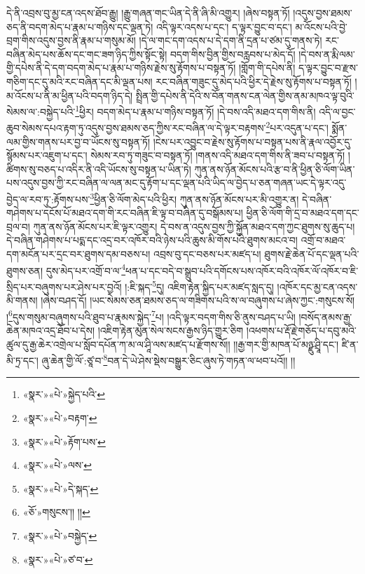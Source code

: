 དེ་ནི་འབྲས་བུ་མྱ་ངན་འདས་ཐོབ་རྒྱུ། །རྒྱུ་གཞན་གང་ཡིན་དེ་ནི་ཞི་མི་འགྱུར། །ཞེས་བསྟན་ཏོ། །འདུས་བྱས་ཐམས་ཅད་ནི་བདག་མེད་པ་རྣམ་པ་གཉིས་དང་ལྡན་ཏེ། འདི་ལྟར་འདས་པ་དང་། ད་ལྟར་བྱུང་བ་དང་། མ་འོངས་པའི་བྱེ་བྲག་གིས་འདུས་བྱས་ནི་རྣམ་པ་གསུམ་མོ། །དེ་ལ་གང་དག་འདས་པ་དེ་དག་ནི་དྲན་པ་ཙམ་དུ་གནས་ཏེ། རང་བཞིན་མེད་པས་ཆོས་དང་གང་ཟག་ཉིད་ཀྱིས་སྟོང་སྟེ། བདག་གིས་བྱིན་གྱིས་བརླབས་པ་མེད་དོ། །དེ་བས་ན་རྨི་ལམ་གྱི་དཔེས་ནི་དེ་དག་བདག་མེད་པ་རྣམ་པ་གཉིས་རྗེས་སུ་རྟོགས་པ་བསྟན་ཏོ། །གློག་གི་དཔེས་ནི། ད་ལྟར་བྱུང་བ་རྫས་གཅིག་དང་དུ་མའི་རང་བཞིན་དང་མི་ལྡན་པས། རང་བཞིན་གཟུང་དུ་མེད་པའི་ཕྱིར་དེ་རྗེས་སུ་རྟོགས་པ་བསྟན་ཏོ། །མ་འོངས་པ་ནི་མ་ཕྱིན་པའི་བདག་ཉིད་དེ། སྤྲིན་གྱི་དཔེས་ནི་དེའི་ས་བོན་གནས་ངན་ལེན་གྱིས་ནམ་མཁའ་ལྟ་བུའི་སེམས་ལ་:བསྐྱེད་པའི་\footnote{«སྣར་»«པེ་»སྐྱེད་པའི་}ཕྱིར། བདག་མེད་པ་རྣམ་པ་གཉིས་བསྟན་ཏོ། །དེ་བས་འདི་མཐའ་དག་གིས་ནི། འདི་ལ་བྱང་ཆུབ་སེམས་དཔའ་རྟག་ཏུ་འདུས་བྱས་ཐམས་ཅད་ཀྱིས་རང་བཞིན་ལ་དེ་ལྟར་བརྟགས་\footnote{«སྣར་»«པེ་»བརྟག་}པར་འདུན་པ་དང་། སྨོན་ལམ་གྱིས་གནས་པར་བྱ་བ་ཡོངས་སུ་བསྟན་ཏོ། །ངེས་པར་འབྱུང་བ་རྗེས་སུ་རྟོགས་པ་བསྟན་པས་ནི་རྣལ་འབྱོར་དུ་སྙོམས་པར་འཇུག་པ་དང་། སེམས་རབ་ཏུ་གཟུང་བ་བསྟན་ཏོ། །གནས་འདི་མཐའ་དག་གིས་ནི་ཟབ་པ་བསྟན་ཏོ། །ཚིགས་སུ་བཅད་པ་འདིར་ནི་འདི་ཡོངས་སུ་བསྟན་པ་ཡིན་ཏེ། ཀུན་ནས་ཉོན་མོངས་པའི་རྩ་བ་ནི་ཕྱིན་ཅི་ལོག་ཡིན་པས་འདུས་བྱས་ཀྱི་རང་བཞིན་ལ་ལན་མང་དུ་རྟོག་པ་དང་ལྡན་པའི་ཡིད་ལ་བྱེད་པ་ཅན་གཞན་ཡང་དེ་ལྟར་འདུ་བྱེད་ལ་རབ་ཏུ་:རྟོགས་པས་\footnote{«སྣར་»«པེ་»རྟོག་པས་}ཕྱིན་ཅི་ལོག་མེད་པའི་ཕྱིར། ཀུན་ནས་ཉོན་མོངས་པར་མི་འགྱུར་ན། དེ་བཞིན་གཤེགས་པ་དངོས་པོ་མཐའ་དག་གི་རང་བཞིན་ཇི་ལྟ་བ་བཞིན་དུ་བསྒོམས་པ། ཕྱིན་ཅི་ལོག་གི་དྲ་བ་མཐའ་དག་དང་བྲལ་བ། ཀུན་ནས་ཉོན་མོངས་པར་ཇི་ལྟར་འགྱུར། དེ་བས་ན་འདུས་བྱས་ཀྱི་སྐྱོན་མཐའ་དག་ཀྱང་ཐུགས་སུ་ཆུད་པ། དེ་བཞིན་གཤེགས་པ་པདྨ་དང་འདྲ་བར་འཁོར་བའི་ཉེས་པའི་ཆུས་མི་གོས་པའི་ཐུགས་མངའ་བ། འགྲོ་བ་མཐའ་དག་མངོན་པར་དྲང་བར་ཐུགས་དམ་བཅས་པ། འབྲས་བུ་དང་བཅས་པར་མཛད་པ། ཐུགས་རྗེ་ཆེན་པོ་དང་ལྡན་པའི་ཐུགས་ཅན། དུས་མེད་པར་འགྲོ་བ་ལ་\footnote{«སྣར་»«པེ་»ལས་}ཕན་པ་དང་བདེ་བ་སྒྲུབ་པའི་དགོངས་པས་འཁོར་བའི་འཁོར་ལོ་འཁོར་བ་ཇི་སྲིད་པར་བཞུགས་པར་ཤེས་པར་བྱའོ། །:ཇི་སྐད་\footnote{«སྣར་»«པེ་»དེ་སྐད་}དུ། འཇིག་རྟེན་སྐྱིད་པར་མཛད་སླད་དུ། །འཁོར་དང་མྱ་ངན་འདས་མི་གནས། །ཞེས་བཤད་དོ། །ཡང་སེམས་ཅན་ཐམས་ཅད་ལ་གཟིགས་པའི་ས་ལ་བཞུགས་པ་ཞེས་ཀྱང་:གསུངས་སོ། །\footnote{«ཅོ་»གསུངས་།། །།}དུས་གསུམ་བཞུགས་པའི་ཐུབ་པ་རྣམས་སྐྱེད་\footnote{«སྣར་»«པེ་»བསྐྱེད་}པ། །འདི་ལྟར་བདག་གིས་ཅི་ནུས་བཤད་པ་ཡི། །བསོད་ནམས་རྒྱ་ཆེན་མཁའ་འདྲ་ཐོབ་པ་དེས། །འཇིག་རྟེན་མུན་སེལ་སངས་རྒྱས་ཉིད་གྱུར་ཅིག །འཕགས་པ་རྡོ་རྗེ་གཅོད་པ་དབུ་མའི་ཚུལ་དུ་རྒྱ་ཆེར་འགྲེལ་པ་སློབ་དཔོན་ཀ་མ་ལ་ཤཱི་ལས་མཛད་པ་རྫོགས་སོ།། །།རྒྱ་གར་གྱི་མཁན་པོ་མཉྫུ་ཤྲཱི་དང་། ཛི་ན་མི་ཏྲ་དང་། ཞུ་ཆེན་གྱི་ལོ་:ཙཱ་བ་\footnote{«སྣར་»«པེ་»ཙ་བ་}བན་དེ་ཡེ་ཤེས་སྡེས་བསྒྱུར་ཅིང་ཞུས་ཏེ་གཏན་ལ་ཕབ་པའོ།། །།
